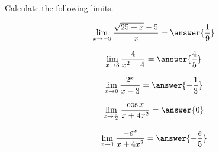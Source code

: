 \documentclass{ximera}
\author{Nela Lakos \and Kyle Parsons \and Bobby Ramsey}
\begin{document}
Calculate the following limits.

\begin{exercise}
	\[\lim_{x\to-9}\frac{\sqrt{25+x} -5}{x} = \answer{\frac{1}{9}}\]
\end{exercise}

\begin{exercise}
	\[\lim_{x\to3}\frac{4}{x^2-4} = \answer{\frac{4}{5}}\]
\end{exercise}


\begin{exercise}
	\[\lim_{x\to0}\frac{2^x}{x-3} = \answer{-\frac{1}{3}}\]
\end{exercise}

\begin{exercise}
	\[\lim_{x\to\frac{\pi}{2}} \frac{\cos x}{x+4x^2} = \answer{{0}}\]
\end{exercise}

\begin{exercise}
	\[\lim_{x\to1}\frac{-e^x}{x+4x^2} = \answer{-\frac{e}{5}} \]
\end{exercise}
\end{document}
